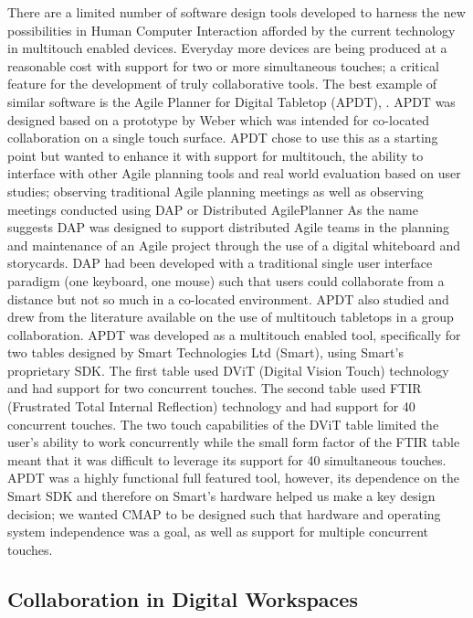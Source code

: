 \documentclass[lnbip,sechang,a4paper]{svmultln}
\begin{document}
There are a limited number of software design tools developed to
harness the new possibilities in Human Computer Interaction afforded
by the current technology in multitouch enabled devices. Everyday more
devices are being produced at a reasonable cost with support for two
or more simultaneous touches; a critical feature for the development
of truly collaborative tools. The best example of similar software is
the Agile Planner for Digital Tabletop (APDT), \cite{Wang}.  APDT was
designed based on a prototype by Weber \cite{Webber} which was
intended for co-located collaboration on a single touch surface. APDT
chose to use this as a starting point but wanted to enhance it with
support for multitouch, the ability to interface with other Agile
planning tools and real world evaluation based on user studies;
observing traditional Agile planning meetings as well as observing
meetings conducted using DAP or Distributed AgilePlanner\cite{DAP} As
the name suggests DAP was designed to support distributed Agile teams
in the planning and maintenance of an Agile project through the use of
a digital whiteboard and storycards. DAP had been developed with a
traditional single user interface paradigm (one keyboard, one mouse)
such that users could collaborate from a distance but not so much in a
co-located environment. APDT also studied and drew from the literature
available on the use of multitouch tabletops in a group
collaboration. APDT was developed as a multitouch enabled tool,
specifically for two tables designed by Smart Technologies Ltd
(Smart), using Smart's proprietary SDK. The first table used DViT
(Digital Vision Touch) \cite{DVT} technology and had support for two
concurrent touches. The second table used FTIR (Frustrated Total
Internal Reflection) \cite{FTIR} technology and had support for 40
concurrent touches. The two touch capabilities of the DViT table
limited the user's ability to work concurrently while the small form
factor of the FTIR table meant that it was difficult to leverage its
support for 40 simultaneous touches. APDT was a highly functional full
featured tool, however, its dependence on the Smart SDK and therefore
on Smart's hardware helped us make a key design decision; we wanted
CMAP to be designed such that hardware and operating system
independence was a goal, as well as support for multiple concurrent
touches.

\subsection{Collaboration in Digital Workspaces}
\end{document}
